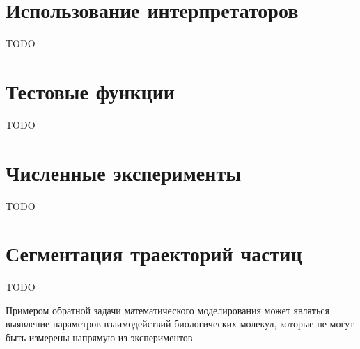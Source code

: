 \section*{Использование интерпретаторов}
TODO

\section*{Тестовые функции}
TODO

\section*{Численные эксперименты}
TODO

\section*{Сегментация траекторий частиц}
TODO

Примером обратной задачи математического моделирования
может являться выявление параметров взаимодействий биологических молекул,
которые не могут быть измерены напрямую из экспериментов.
